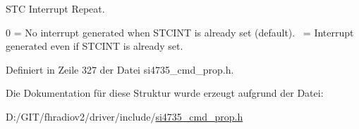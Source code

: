 S\+T\+C Interrupt Repeat. 

0 = No interrupt generated when S\+T\+C\+I\+N\+T is already set (default).~ = Interrupt generated even if S\+T\+C\+I\+N\+T is already set. 

Definiert in Zeile 327 der Datei si4735\+\_\+cmd\+\_\+prop.\+h.



Die Dokumentation für diese Struktur wurde erzeugt aufgrund der Datei\+:\begin{DoxyCompactItemize}
\item 
D\+:/\+G\+I\+T/fhradiov2/driver/include/\hyperlink{si4735__cmd__prop_8h}{si4735\+\_\+cmd\+\_\+prop.\+h}\end{DoxyCompactItemize}
